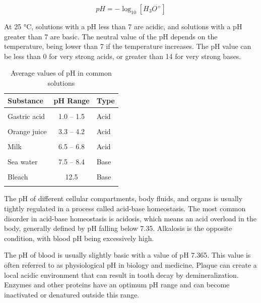 \[pH = - \log_{10} [H_3O^+]\]

At 25 °C, solutions with a pH less than 7 are acidic, and solutions with a pH greater than 7 are basic. The neutral value of the pH depends on the temperature, being lower than 7 if the temperature increases. The pH value can be less than 0 for very strong acids, or greater than 14 for very strong bases.

\begin{table}[!h]

\caption{\label{tab:solutions}Average values of pH in common solutions}
\centering
\begin{tabular}[t]{lcl}
\toprule
Substance & pH Range & Type\\
\midrule
\cellcolor{gray!6}{Battery acid} & \cellcolor{gray!6}{< 1} & \cellcolor{gray!6}{Acid}\\
Gastric acid & 1.0 – 1.5 & Acid\\
\cellcolor{gray!6}{Vinegar} & \cellcolor{gray!6}{2.5} & \cellcolor{gray!6}{Acid}\\
Orange juice & 3.3 – 4.2 & Acid\\
\cellcolor{gray!6}{Black coffee} & \cellcolor{gray!6}{5 – 5.03} & \cellcolor{gray!6}{Acid}\\
\addlinespace
Milk & 6.5 – 6.8 & Acid\\
\cellcolor{gray!6}{Pure water} & \cellcolor{gray!6}{7} & \cellcolor{gray!6}{Neutral}\\
Sea water & 7.5 – 8.4 & Base\\
\cellcolor{gray!6}{Ammonia} & \cellcolor{gray!6}{11.0 – 11.5} & \cellcolor{gray!6}{Base}\\
Bleach & 12.5 & Base\\
\addlinespace
\cellcolor{gray!6}{Lye} & \cellcolor{gray!6}{13.0 – 13.} & \cellcolor{gray!6}{Base}\\
\bottomrule
\end{tabular}
\end{table}

The pH of different cellular compartments, body fluids, and organs is usually tightly regulated in a process called acid-base homeostasis. The most common disorder in acid-base homeostasis is acidosis, which means an acid overload in the body, generally defined by pH falling below 7.35. Alkalosis is the opposite condition, with blood pH being excessively high.

The pH of blood is usually slightly basic with a value of pH 7.365. This value is often referred to as physiological pH in biology and medicine. Plaque can create a local acidic environment that can result in tooth decay by demineralization. Enzymes and other proteins have an optimum pH range and can become inactivated or denatured outside this range.

